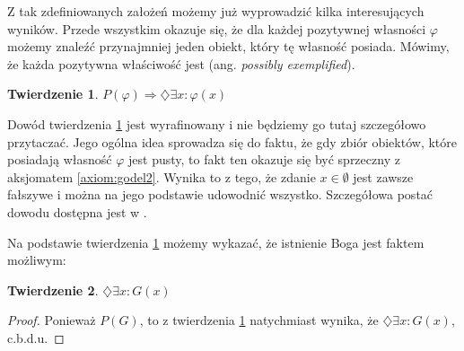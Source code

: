 \documentclass{article}
\newtheorem{theorem-g}{Twierdzenie}
\begin{document}
Z tak zdefiniowanych założeń możemy już wyprowadzić kilka interesujących wyników. Przede wszystkim okazuje się, że dla każdej pozytywnej własności $\varphi$ możemy znaleźć przynajmniej jeden obiekt, który tę własność posiada. Mówimy, że każda pozytywna właściwość jest  (ang. \emph{possibly exemplified}). 
\begin{theorem-g} \label{th:godel1}
	$P(\varphi) \Rightarrow \diamondsuit \exists x: \varphi(x)$
\end{theorem-g}
Dowód twierdzenia \ref{th:godel1} jest wyrafinowany i nie będziemy go tutaj szczegółowo przytaczać. Jego ogólna idea sprowadza się do faktu, że gdy zbiór obiektów, które posiadają własność $\varphi$ jest pusty, to fakt ten okazuje się być sprzeczny z aksjomatem \ref{axiom:godel2}. Wynika to z tego, że zdanie $x \in \emptyset$ jest zawsze fałszywe i można na jego podstawie udowodnić wszystko. Szczegółowa postać dowodu dostępna jest w \cite{Anderson1990}.  

Na podstawie twierdzenia \ref{th:godel1} możemy wykazać, że istnienie Boga jest faktem możliwym:
\begin{theorem-g} \label{th:godel2}
	$\diamondsuit \exists x: G(x)$
\end{theorem-g}
\begin{proof}
	Ponieważ $P(G)$, to z twierdzenia \ref{th:godel1} natychmiast wynika, że $\diamondsuit \exists x: G(x)$, c.b.d.u.
\end{proof}
\end{document}
